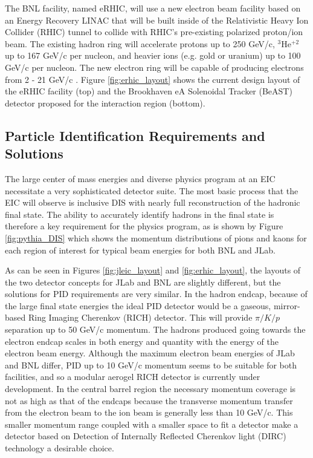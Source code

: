 The BNL facility, named eRHIC, will use a new electron beam facility based on an Energy Recovery LINAC that will be built inside of the Relativistic Heavy Ion Collider (RHIC) tunnel to collide with RHIC's pre-existing polarized proton/ion beam. The existing hadron ring will accelerate protons up to 250 GeV/c, $^3$He$^{+2}$ up to 167 GeV/c per nucleon, and heavier ions (e.g. gold or uranium) up to 100 GeV/c per nucleon. The new electron ring will be capable of producing electrons from 2 - 21 GeV/c \cite{eRHICdesign}. Figure \ref{fig:erhic_layout} shows the current design layout of the eRHIC facility (top) and the Brookhaven eA Solenoidal Tracker (BeAST) detector proposed for the interaction region (bottom).

\subsection{Particle Identification Requirements and Solutions}
The large center of mass energies and diverse physics program at an EIC necessitate a very sophisticated detector suite. The most basic process that the EIC will observe is inclusive DIS with nearly full reconstruction of the hadronic final state. The ability to accurately identify hadrons in the final state is therefore a key requirement for the physics program, as is shown by Figure \ref{fig:pythia_DIS} which shows the momentum distributions of pions and kaons for each region of interest for typical beam energies for both BNL and JLab.

As can be seen in Figures \ref{fig:jleic_layout} and \ref{fig:erhic_layout}, the layouts of the two detector concepts for JLab and BNL are slightly different, but the solutions for PID requirements are very similar. In the hadron endcap, because of the large final state energies the ideal PID detector would be a gaseous, mirror-based Ring Imaging Cherenkov (RICH) detector. This will provide $\pi/K/p$ separation up to 50 GeV/c momentum. The hadrons produced going towards the electron endcap scales in both energy and quantity with the energy of the electron beam energy. Although the maximum electron beam energies of JLab and BNL differ, PID up to 10 GeV/c momentum seems to be suitable for both facilities, and so a modular aerogel RICH detector is currently under development. In the central barrel region the necessary momentum coverage is not as high as that of the endcaps because the transverse momentum transfer from the electron beam to the ion beam is generally less than 10 GeV/c. This smaller momentum range coupled with a smaller space to fit a detector make a detector based on Detection of Internally Reflected Cherenkov light (DIRC) technology a desirable choice.

